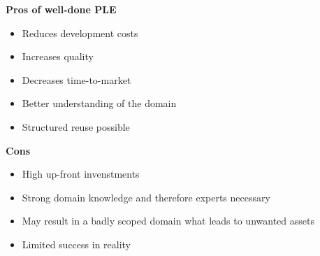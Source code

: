 \begin{minipage}[t]{0.49\textwidth}
    \textbf{Pros of well-done PLE}
    \begin{itemize}[topsep=0pt, itemsep=0pt]
        \item Reduces development costs
        \item Increases quality
        \item Decreases time-to-market
        \item Better understanding of the domain
        \item Structured reuse possible
    \end{itemize}
\end{minipage}
\begin{minipage}[t]{0.49\textwidth}
    \textbf{Cons}
    \begin{itemize}[topsep=0pt, itemsep=0pt]
        \item High up-front invenstments
        \item Strong domain knowledge and therefore experts necessary
        \item May result in a badly scoped domain what leads to unwanted assets
        \item Limited success in reality
    \end{itemize}
\end{minipage}

